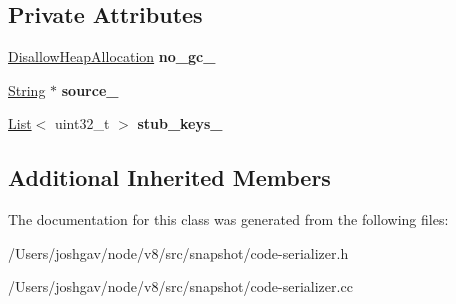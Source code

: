 \subsection*{Private Attributes}
\begin{DoxyCompactItemize}
\item 
\hyperlink{classv8_1_1internal_1_1_per_thread_assert_scope_debug_only}{Disallow\+Heap\+Allocation} {\bfseries no\+\_\+gc\+\_\+}\hypertarget{classv8_1_1internal_1_1_code_serializer_aaa850105400dbe9e4505dbfc359f4021}{}\label{classv8_1_1internal_1_1_code_serializer_aaa850105400dbe9e4505dbfc359f4021}

\item 
\hyperlink{classv8_1_1internal_1_1_string}{String} $\ast$ {\bfseries source\+\_\+}\hypertarget{classv8_1_1internal_1_1_code_serializer_a8d25baf1186fead6b5ff46db2465040f}{}\label{classv8_1_1internal_1_1_code_serializer_a8d25baf1186fead6b5ff46db2465040f}

\item 
\hyperlink{classv8_1_1internal_1_1_list}{List}$<$ uint32\+\_\+t $>$ {\bfseries stub\+\_\+keys\+\_\+}\hypertarget{classv8_1_1internal_1_1_code_serializer_a6993950fb58cfa56dfe41b0ff5da5b21}{}\label{classv8_1_1internal_1_1_code_serializer_a6993950fb58cfa56dfe41b0ff5da5b21}

\end{DoxyCompactItemize}
\subsection*{Additional Inherited Members}


The documentation for this class was generated from the following files\+:\begin{DoxyCompactItemize}
\item 
/\+Users/joshgav/node/v8/src/snapshot/code-\/serializer.\+h\item 
/\+Users/joshgav/node/v8/src/snapshot/code-\/serializer.\+cc\end{DoxyCompactItemize}
